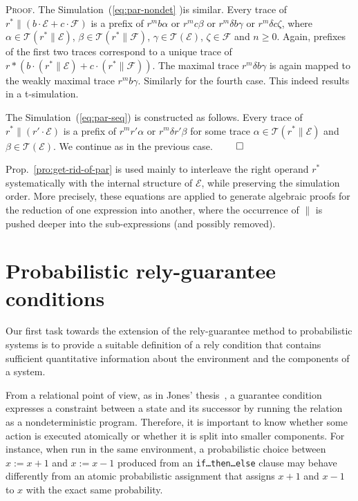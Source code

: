 \documentclass[review]{elsart}
\newenvironment{proof}{\par
\noindent
\textsc{Proof. }
\noindent}{\hfill\(\qed\)}
\newcommand{\EE}{\mathcal{E}}
\newcommand{\FF}{\mathcal{F}}
\newcommand{\TT}{\mathcal{T}}
\newcommand{\unity}{\delta}
\newcommand{\bks}{*}
\newcommand{\Prop}[1]{Prop.~\ref{#1}}
\begin{document}
\begin{proof}
The Simulation~(\ref{eq:par-nondet} )is similar. Every trace of $r^{\bks}\|(b{\cdot}\EE{+}c{\cdot}\FF)$ is a prefix of $r^mb\alpha$ or $r^mc\beta$ or $r^m\unity b\gamma$ or $r^m\unity c\zeta$, where $\alpha{\in}\TT(r^{\bks}\|\EE)$, $\beta{\in}\TT(r^{\bks}\|\FF)$, $\gamma{\in}\TT(\EE)$, $\zeta{\in}\FF$ and $n\geq0$. Again, prefixes of the first two traces correspond to a unique trace of $r{\bks}(b{\cdot} (r^{\bks}\|\EE) {+} c{\cdot}(r^{\bks}\|\FF))$. The maximal trace $r^m\unity b\gamma$ is again mapped to the weakly maximal trace $r^mb\gamma$. Similarly for the fourth case. This indeed results in a t-simulation.

The Simulation~(\ref{eq:par-seq}) is constructed as follows. Every trace of $r^{\bks}\|(r'{\cdot}\EE)$ is a prefix of $r^mr'\alpha$ or $r^m\unity r'\beta$ for some trace $\alpha{\in}\TT(r^{\bks}\|\EE)$ and $\beta{\in}\TT(\EE)$. We continue as in the previous case.
\end{proof}

\Prop{pro:get-rid-of-par} is used mainly to interleave the right operand $r^{\bks}$ systematically with the internal structure of $\EE$, while preserving the simulation order. More precisely, these equations are applied to generate algebraic proofs for the reduction of one expression into another, where the occurrence of $\|$ is pushed deeper into the sub-expressions (and possibly removed).


\section{Probabilistic rely-guarantee conditions}\label{sec:prgc}

Our first task towards the extension of the rely-guarantee method to probabilistic systems is to provide a suitable definition of a rely condition that contains sufficient quantitative information about the environment and the components of a system. 

From a relational point of view, as in Jones' thesis~\cite{Jon81}, a guarantee condition expresses a constraint between a state and its successor by running the relation as a nondeterministic program. Therefore, it is important to know whether some action is executed atomically or whether it is split into smaller components. 
For instance, when run in the same environment, a probabilistic choice between $x{:=}x{+}1$ and $x{:=}x{-}1$ produced from an \texttt{if\dots then\dots else} clause may behave differently from an atomic probabilistic assignment that assigns $x{+}1$ and $x{-}1$ to $x$ with the exact same probability.
\end{document}
